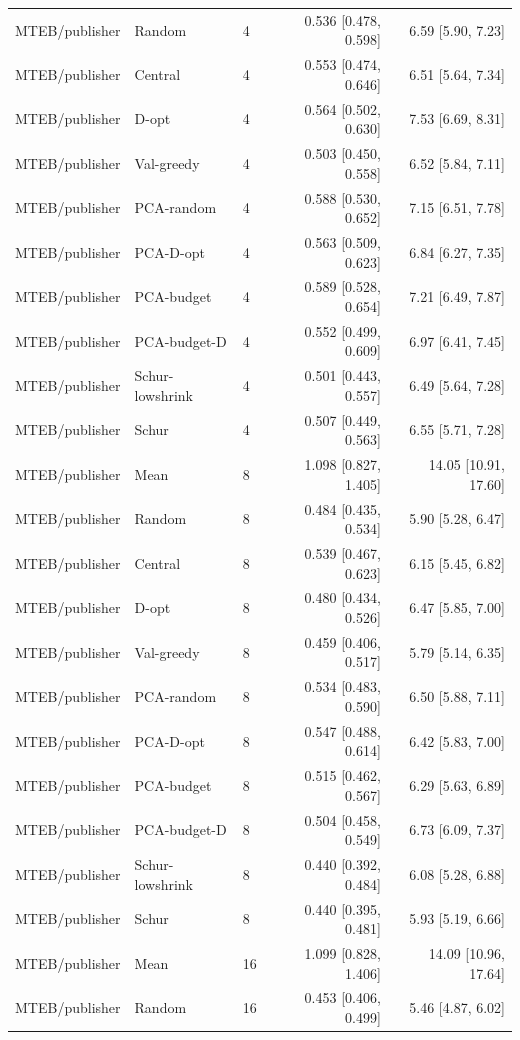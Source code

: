 \begin{longtable}{lllrr}
MTEB/publisher & Random & 4 & 0.536 [0.478, 0.598] & 6.59 [5.90, 7.23]\\
MTEB/publisher & Central & 4 & 0.553 [0.474, 0.646] & 6.51 [5.64, 7.34]\\
MTEB/publisher & D-opt & 4 & 0.564 [0.502, 0.630] & 7.53 [6.69, 8.31]\\
MTEB/publisher & Val-greedy & 4 & 0.503 [0.450, 0.558] & 6.52 [5.84, 7.11]\\
MTEB/publisher & PCA-random & 4 & 0.588 [0.530, 0.652] & 7.15 [6.51, 7.78]\\
MTEB/publisher & PCA-D-opt & 4 & 0.563 [0.509, 0.623] & 6.84 [6.27, 7.35]\\
MTEB/publisher & PCA-budget & 4 & 0.589 [0.528, 0.654] & 7.21 [6.49, 7.87]\\
MTEB/publisher & PCA-budget-D & 4 & 0.552 [0.499, 0.609] & 6.97 [6.41, 7.45]\\
MTEB/publisher & Schur-lowshrink & 4 & 0.501 [0.443, 0.557] & 6.49 [5.64, 7.28]\\
MTEB/publisher & Schur & 4 & 0.507 [0.449, 0.563] & 6.55 [5.71, 7.28]\\
MTEB/publisher & Mean & 8 & 1.098 [0.827, 1.405] & 14.05 [10.91, 17.60]\\
MTEB/publisher & Random & 8 & 0.484 [0.435, 0.534] & 5.90 [5.28, 6.47]\\
MTEB/publisher & Central & 8 & 0.539 [0.467, 0.623] & 6.15 [5.45, 6.82]\\
MTEB/publisher & D-opt & 8 & 0.480 [0.434, 0.526] & 6.47 [5.85, 7.00]\\
MTEB/publisher & Val-greedy & 8 & 0.459 [0.406, 0.517] & 5.79 [5.14, 6.35]\\
MTEB/publisher & PCA-random & 8 & 0.534 [0.483, 0.590] & 6.50 [5.88, 7.11]\\
MTEB/publisher & PCA-D-opt & 8 & 0.547 [0.488, 0.614] & 6.42 [5.83, 7.00]\\
MTEB/publisher & PCA-budget & 8 & 0.515 [0.462, 0.567] & 6.29 [5.63, 6.89]\\
MTEB/publisher & PCA-budget-D & 8 & 0.504 [0.458, 0.549] & 6.73 [6.09, 7.37]\\
MTEB/publisher & Schur-lowshrink & 8 & 0.440 [0.392, 0.484] & 6.08 [5.28, 6.88]\\
MTEB/publisher & Schur & 8 & 0.440 [0.395, 0.481] & 5.93 [5.19, 6.66]\\
MTEB/publisher & Mean & 16 & 1.099 [0.828, 1.406] & 14.09 [10.96, 17.64]\\
MTEB/publisher & Random & 16 & 0.453 [0.406, 0.499] & 5.46 [4.87, 6.02]\\

\end{longtable}
